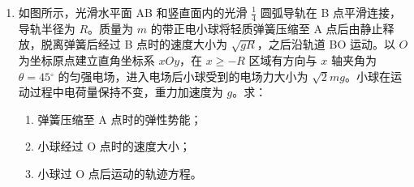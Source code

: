 \documentclass[\gkver]{gaokaozhenti}
\begin{document}
\begin{enumerate}
{代入数据可得 $a = 2.7 \Umsq$

（2）根据向心加速度的表达式 $a=\frac{v^{2}}{R}$

可得甲、乙的向心加速度之比为

$\frac{a_{\text{甲}}}{a_{\text{乙}}}=\frac{v_{\text{甲}}^{2}}{v_{\text{乙}}^{2}}\times\frac{R_{\text{乙}}}{R_{\text{甲}}}=\frac{225}{242}$

甲、乙两物体做匀速圆周运动，则运动的时间为 $t=\frac{\pi R}{v}$

代入数据可得甲、乙运动的时间为 $t_{\text{甲}}=\frac{4\pi}{5}\Us$，$t_{\text{乙}}=\frac{9\pi}{11}\Us$

因 $t_{\text{甲}} < t_{\text{乙}}$，所以甲先出弯道。
}

\item
如图所示，光滑水平面 AB 和竖直面内的光滑 $\frac{1}{4}$ 圆弧导轨在 B 点平滑连接，导轨半径为 $R$。质量为 $m$ 的带正电小球将轻质弹簧压缩至 A 点后由静止释放，脱离弹簧后经过 B 点时的速度大小为 $\sqrt{gR}$，之后沿轨道 BO 运动。以 $O$ 为坐标原点建立直角坐标系 $xOy$，在 $x \geq -R$ 区域有方向与 $x$ 轴夹角为 $\theta = 45{^\circ}$ 的匀强电场，进入电场后小球受到的电场力大小为 $\sqrt{2}mg$。小球在运动过程中电荷量保持不变，重力加速度为 $g$。求：

\begin{enumerate}
	\item
	弹簧压缩至 A 点时的弹性势能；
	\item
	小球经过 O 点时的速度大小；
	\item
	小球过 O 点后运动的轨迹方程。
\end{enumerate}


\end{enumerate}
\end{document}
